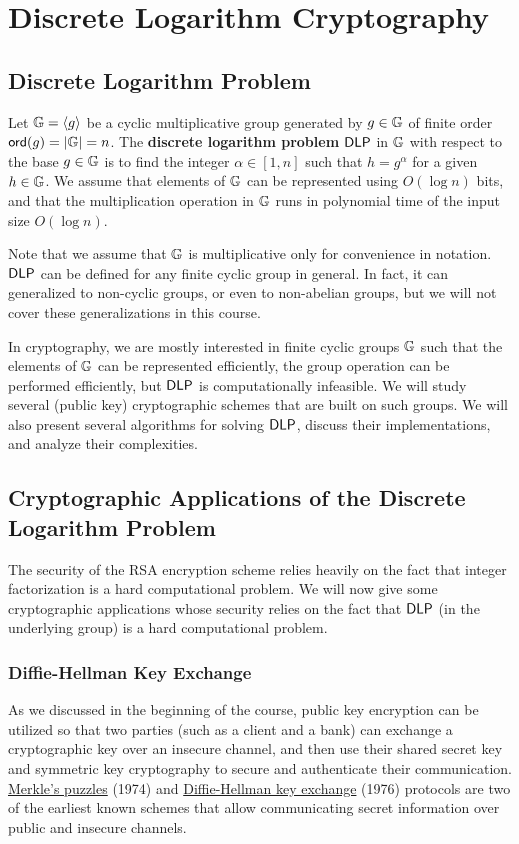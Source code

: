 \section{Discrete Logarithm Cryptography}

\subsection{Discrete Logarithm Problem}
Let $\mathbb{G} = \langle g \rangle$ be a cyclic multiplicative group generated by 
$g \in \mathbb{G}$ of finite order ${\sf ord}(g) = |\mathbb{G}| = n$. The {\bf discrete logarithm 
problem} ${\sf DLP}$ in $\mathbb{G}$ with respect to the base $g \in \mathbb{G}$ is to find the integer 
$\alpha \in [1, n]$ such that $h = g^\alpha$ for a given $h \in \mathbb{G}$. We assume 
that elements of $\mathbb{G}$ can be represented using $O(\log n)$ bits, and that the 
multiplication operation in $\mathbb{G}$ runs in polynomial time of the input size 
$O(\log n)$. 

Note that we assume that $\mathbb{G}$ is multiplicative only for convenience in notation. 
${\sf DLP}$ can be defined for any finite cyclic group in general. In fact, it 
can generalized to non-cyclic groups, or even to non-abelian groups, but we will 
not cover these generalizations in this course. 

In cryptography, we are mostly interested in finite cyclic groups $\mathbb{G}$ such that 
the elements of $\mathbb{G}$ can be represented efficiently, the group operation can be 
performed efficiently, but ${\sf DLP}$ is computationally infeasible. We will study 
several (public key) cryptographic schemes that are built on such groups. We 
will also present several algorithms for solving ${\sf DLP}$, discuss their 
implementations, and analyze their complexities. 

\subsection{Cryptographic Applications of the Discrete Logarithm Problem}
The security of the RSA encryption scheme relies heavily on the fact that integer 
factorization is a hard computational problem. We will now give some cryptographic
applications whose security relies on the fact that ${\sf DLP}$ (in the underlying 
group) is a hard computational problem. 

\subsubsection{Diffie-Hellman Key Exchange}
As we discussed in the beginning of the course, public key encryption can be 
utilized so that two parties (such as a client and a bank) can exchange a 
cryptographic key over an insecure channel, and then use their shared secret 
key and symmetric key cryptography to secure and authenticate their communication. 
\href{https://en.wikipedia.org/wiki/Merkle%27s_Puzzles}{Merkle's puzzles} (1974) 
and \href{https://en.wikipedia.org/wiki/Diffie%E2%80%93Hellman_key_exchange}
{Diffie-Hellman key exchange} (1976) protocols are two of the earliest known 
schemes that allow communicating secret information over public and insecure 
channels. 

